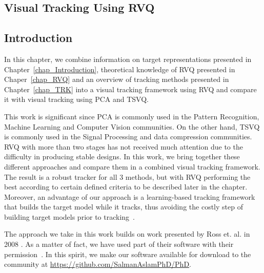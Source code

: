


\begin{FrontMatter}
\contents %
\end{FrontMatter}
\begin{Body}

\chapter{Visual Tracking Using RVQ}
\label{chap_RVQ_TRK}	
\section{Introduction}
In this chapter, we combine information on target representations presented in Chapter~\ref{chap_Introduction}, theoretical knowledge of RVQ presented in Chaper~\ref{chap_RVQ} and an overview of tracking methods presented in Chapter~\ref{chap_TRK} into a visual tracking framework using RVQ and compare it with visual tracking using PCA and TSVQ.  

This work is significant since PCA is commonly used in the Pattern Recognition, Machine Learning and Computer Vision communities.  On the other hand, TSVQ is commonly used in the Signal Processing and data compression communities.  RVQ with more than two stages has not received much attention due to the difficulty in producing stable designs.  In this work, we bring together these different approaches and compare them in a combined visual tracking framework.  The result is a robust tracker for all 3 methods, but with RVQ performing the best according to certain defined criteria to be described later in the chapter.  Moreover, an advantage of our approach is a learning-based tracking framework that builds the target model while it tracks, thus avoiding the costly step of building target models prior to tracking~\cite{2004_JNL_SVMtracking_Avidan}.

The approach we take in this work builds on work presented by Ross et. al. in 2008 \cite{2008_JNL_subspaceTRK_Ross}.  As a matter of fact, we have used part of their software with their permission~\cite{2008_SFT_Ross}.  In this spirit, we make our software available for download to the community at \url{https://github.com/SalmanAslamPhD/PhD}.  


\end{Body}
